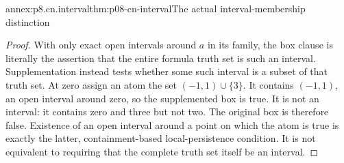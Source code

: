 \begin{annexitem}{annex:p8.cn.interval}{thm:p08-cn-interval}{The actual interval-membership distinction}
\begin{proof}
With only exact open intervals around \(a\) in its family, the
box clause is literally the assertion that the entire formula
truth set is such an interval. Supplementation instead tests
whether some such interval is a subset of that truth set.
At zero assign an atom the set \((-1,1)\cup\{3\}\).
It contains \((-1,1)\), an open interval around zero, so the
supplemented box is true. It is not an interval: it contains
zero and three but not two. The original box is therefore false.
Existence of an open interval around a point on which the atom
is true is exactly the latter, containment-based local-persistence
condition. It is not equivalent to requiring that the complete
truth set itself be an interval.
\end{proof}
\end{annexitem}

